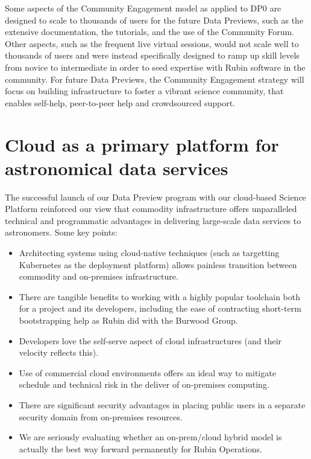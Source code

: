 \documentclass[11pt,twoside]{article}
\begin{document}
Some aspects of the Community Engagement model as applied to DP0 are designed to scale to thousands of users for the future Data Previews, such as the extensive documentation, the tutorials, and the use of the Community Forum.
Other aspects, such as the frequent live virtual sessions, would not scale well to thousands of users and were instead specifically designed to ramp up skill levels from novice to intermediate in order to seed expertise with Rubin software in the community.
For future Data Previews, the Community Engagement strategy will focus on building infrastructure to foster a vibrant science community, that enables self-help, peer-to-peer help and crowdsourced support.

\section{Cloud as a primary platform for astronomical data services}

The successful launch of our Data Preview program with our cloud-based Science Platform reinforced our view that commodity infrastructure offers unparalleled technical and programmatic advantages in delivering large-scale data services to astronomers. Some key points:

\begin{itemize}

    \item Architecting systems using cloud-native techniques (such as targetting Kubernetes as the deployment platform) allows painless transition between commodity and on-premises infrastructure.
    \item There are tangible benefits to working with a highly popular toolchain both for a project and its developers, including the ease of contracting short-term bootstrapping help as Rubin did with the Burwood Group.
    \item Developers love the self-serve aspect of cloud infrastructures (and their velocity reflects this).
    \item Use of commercial cloud environments offers an ideal way to mitigate schedule and technical risk in the deliver of on-premises computing.
    \item There are significant security advantages in placing public users in a separate security domain from on-premises resources.
    \item We are seriously evaluating whether an on-prem/cloud hybrid model is actually the best way forward permanently for Rubin Operations.
\end{itemize}
\end{document}
